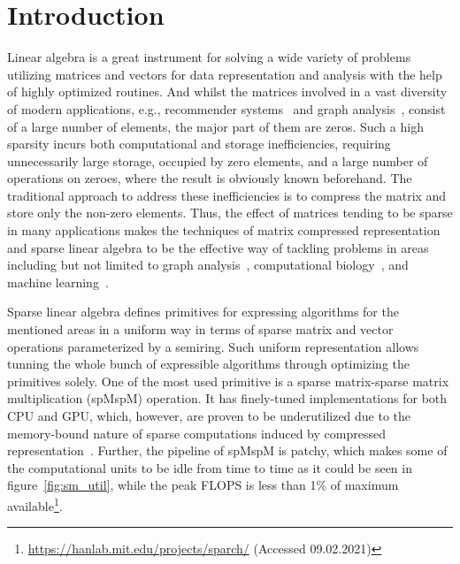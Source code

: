 \documentclass[10pt,conference]{IEEEtran}
\begin{document}
\section*{Introduction}
Linear algebra is a great instrument for solving a wide variety of problems utilizing matrices and vectors for data representation and analysis with the help of highly optimized routines.
And whilst the matrices involved in a vast diversity of modern applications, e.g., recommender systems~\cite{gupta2020architectural,amazon} and graph analysis~\cite{graph1,graph2}, consist of a large number of elements, the major part of them are zeros.
Such a high sparsity incurs both computational and storage inefficiencies, requiring unnecessarily large storage, occupied by zero elements, and a large number of operations on zeroes, where the result is obviously known beforehand.
The traditional approach to address these inefficiencies is to compress the matrix and store only the non-zero elements. 
Thus, the effect of matrices tending to be sparse in many applications makes the techniques of matrix compressed representation and sparse linear algebra to be the effective way of tackling problems in areas including but not limited to graph analysis~\cite{GAILLA}, computational biology~\cite{compBio}, and machine learning~\cite{Kepner_2017}.



Sparse linear algebra defines primitives for expressing algorithms for the mentioned areas in a uniform way in terms of sparse matrix and vector operations parameterized by a semiring.
Such uniform representation allows tunning the whole bunch of expressible algorithms through optimizing the primitives solely.
One of the most used primitive is a sparse matrix-sparse matrix multiplication (spMspM) operation. 
It has finely-tuned implementations for both CPU and GPU, which, however, are proven to be underutilized due to the memory-bound nature of sparse computations induced by compressed representation~\cite{Florida,leskovec2016snap,Song_2016,zhang2020sparch}.
Further, the pipeline of spMspM is patchy, which makes some of the computational units to be idle from time to time as it could be seen in figure~\ref{fig:sm_util}, while the peak FLOPS is less than 1\% of maximum available\footnote{\url{https://hanlab.mit.edu/projects/sparch/} (Accessed 09.02.2021)}. 
\end{document}
